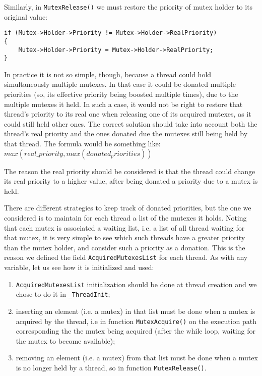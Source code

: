 Similarly, in \lstinline|MutexRelease()| we must restore the priority of mutex holder to its original value:
\begin{lstlisting}
if (Mutex->Holder->Priority != Mutex->Holder->RealPriority)
{
    Mutex->Holder->Priority = Mutex->Holder->RealPriority;
}
\end{lstlisting}

In practice it is not so simple, though, because a thread could hold simultaneously multiple mutexes. In that case it could be donated multiple priorities (so, its effective priority being boosted multiple times), due to the multiple mutexes it held. In such a case, it would not be right to restore that thread's priority to its real one when releasing one of its acquired mutexes, as it could still held other ones. The correct solution should take into account both the thread's real priority and the ones donated due the mutexes still being held by that thread. The formula would be something like:
$max(real\_priority, max(donated_priorities))$

The reason the real priority should be considered is that the thread could change its real priority to a higher value, after being donated a priority due to a mutex is held. 

There are different strategies to keep track of donated priorities, but the one we considered is to maintain for each thread a list of the mutexes it holds. Noting that each mutex is associated a waiting list, i.e. a list of all thread waiting for that mutex, it is very simple to see which such threads have a greater priority than the mutex holder, and consider such a priority as a donation. This is the reason we defined the field \lstinline|AcquiredMutexesList| for each thread. As with any variable, let us see how it is initialized and used:
\begin{enumerate}
    \item \lstinline|AcquiredMutexesList| initialization should be done at thread creation and we chose to do it in \lstinline|_ThreadInit|;
    
    \item \label{item:insert-a-mutex} inserting an element (i.e. a mutex) in that list must be done when a mutex is acquired by the thread, i.e in function \lstinline|MutexAcquire()| on the execution path corresponding the the mutex being acquired (after the while loop, waiting for the mutex to become available);
    
    \item \label{item:remove-mutex}removing an element (i.e. a mutex) from that list must be done when a mutex is no longer held by a thread, so in function \lstinline|MutexRelease()|. 
\end{enumerate}

